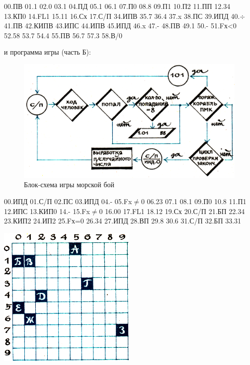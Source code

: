 \documentclass[11pt,a4paper,oneside]{article}
\begin{document}
00.ПВ 01.1 02.0 03.1 04.ПД 05.1 06.1 07.П0 08.8 09.П1 10.П2 11.ПП
12.34 13.КП0 14.FL1 15.11 16.Сх 17.С/П
34.ИПВ 35.7 36.4 37.x 38.ПС 39.ИПД 40.$\div$ 41.ПВ 42.КИПВ 43.ИПС 44.ИПВ 45.ИПД 46.x 47.- 48.ПВ 49.1 50.- 51.Fх<0 52.58 53.7 54.4 55.ПВ 56.7 57.3 58.В/0

и программа игры (часть Б):

\begin{figure}[H]
\includegraphics[width=\textwidth]{sea2}
\caption{Блок-схема игры морской бой}
\end{figure}

00.ИПД 01.С/П 02.ПС 03.ИПД 04.- 05.Fx$\neq$0 06.23 07.1 08.1 09.П0 10.8 11.П1 12.ИПС 13.КИП0 14.- 15.Fx$\neq$0
16.00 17.FL1 18.12 19.Сх 20.С/П 21.БП 22.34 23.КИП2 24.ИП2 25.Fх=0
26.34 27.ИПД 28.ВП 29.8 30.6 31.С/П 32.БП 33.31

\includegraphics[width=0.5\textwidth]{sea3}
\end{document}
